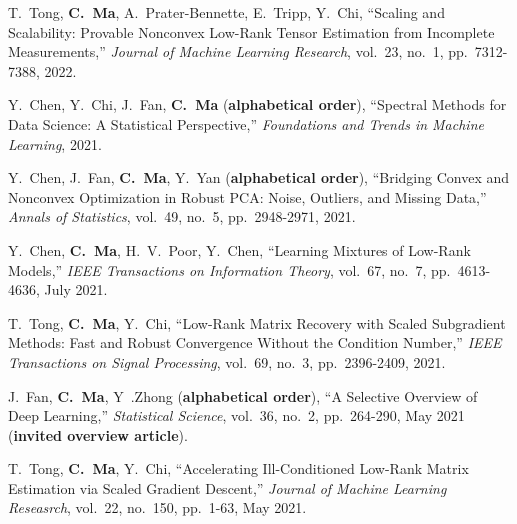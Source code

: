 \documentclass[a4paper, 10pt]{article}
\newenvironment{changemargin}[2]{%
  \begin{list}{}{%
    \setlength{\topsep}{0pt}%
    \setlength{\leftmargin}{#1}%
    \setlength{\rightmargin}{#2}%
    \setlength{\listparindent}{\parindent}%
    \setlength{\itemindent}{\parindent}%
    \setlength{\parsep}{\parskip}%
  }%
  \item[]}{\end{list}
}
\newenvironment{body} {
	\vspace*{-16pt}
	\begin{changemargin}{-0.3in}{-0.5in}
  }	
	{\end{changemargin}
}
\begin{document}
\begin{body}
\begin{enumerate}[label={[{J}{{\arabic*}}]}]
\item T.~Tong, \textbf{C.~Ma}, A.~Prater-Bennette, E.~Tripp, Y.~Chi, {``Scaling and Scalability: Provable Nonconvex Low-Rank Tensor
Estimation from Incomplete Measurements,''} \emph{Journal of Machine Learning Research}, vol.~23, no.~1, pp.~7312-7388, 2022. \\



\item Y.~Chen, Y.~Chi, J.~Fan, \textbf{C.~Ma} (\textbf{alphabetical order}), {``Spectral Methods for Data Science: A Statistical Perspective,''}  \emph{Foundations and Trends in Machine Learning}, 2021. \\

\item Y.~Chen, J.~Fan, \textbf{C.~Ma}, Y.~Yan (\textbf{alphabetical order}), {``Bridging Convex and Nonconvex Optimization in Robust PCA: Noise, Outliers, and Missing Data,''}  \emph{Annals of Statistics}, vol.~49, no.~5, pp.~2948-2971, 2021. \\

\item Y.~Chen, \textbf{C.~Ma}, H.~V.~Poor, Y.~Chen, {``Learning Mixtures of Low-Rank Models,''} \emph{IEEE Transactions on Information Theory}, vol.~67, no.~7, pp.~4613-4636, July 2021. \\






\item T.~Tong, \textbf{C.~Ma}, Y.~Chi, {``Low-Rank Matrix Recovery with Scaled Subgradient Methods: Fast and Robust Convergence Without the Condition Number,''}  \emph{IEEE Transactions on Signal Processing}, vol.~69, no.~3, pp.~2396-2409, 2021. \\







\item J.~Fan, \textbf{C.~Ma}, Y~.Zhong (\textbf{alphabetical order}), {``A Selective Overview of Deep Learning,''} \emph{Statistical Science}, vol.~36, no.~2, pp.~264-290, May 2021 (\textbf{invited overview article}).\\

\item T.~Tong, \textbf{C.~Ma}, Y.~Chi, {``Accelerating Ill-Conditioned Low-Rank Matrix Estimation via Scaled Gradient Descent,''} \emph{Journal of Machine Learning Reseasrch}, vol.~22, no.~150, pp.~1-63, May 2021. \\


\end{enumerate}
\end{body}
\end{document}
